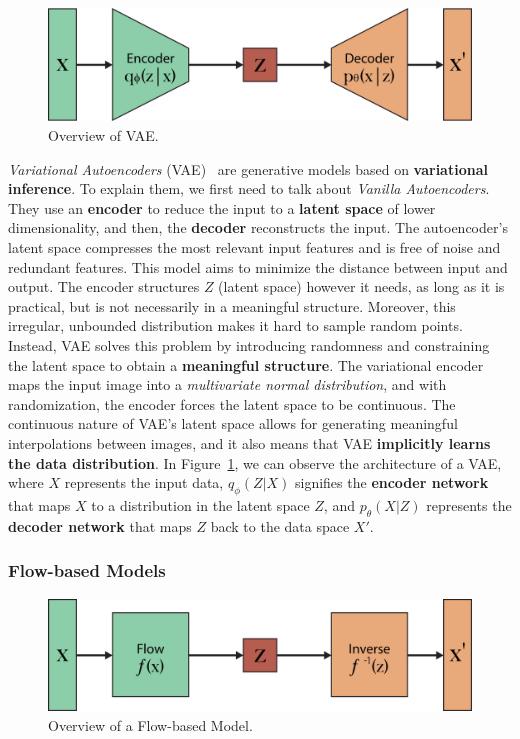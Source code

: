 \documentclass[preprint]{elsarticle}
\begin{document}
\begin{figure}[t]
	\centering
    \includegraphics[scale=0.8]{img/svg/VAE.png}
    \caption{Overview of VAE.}\label{fig:vae}
\end{figure}

\emph{Variational Autoencoders} (VAE)~\cite{kingma2022autoencoding} are generative models based on \textbf{variational inference}.
To explain them, we first need to talk about \emph{Vanilla Autoencoders}.
They use an \textbf{encoder} to reduce the input to a \textbf{latent space} of lower dimensionality, and then, the \textbf{decoder} reconstructs the input. 
The autoencoder's latent space compresses the most relevant input features and is free of noise and redundant features.
This model aims to minimize the distance between input and output. The encoder structures $Z$ (latent space) however it needs, as long as it is practical, but is not necessarily in a meaningful structure. 
Moreover, this irregular, unbounded distribution makes it hard to sample random points.
Instead, VAE solves this problem by introducing randomness and constraining the latent space to obtain a \textbf{meaningful structure}. 
The variational encoder maps the input image into a \emph{multivariate normal distribution}, and with randomization, the encoder forces the latent space to be continuous. 
The continuous nature of VAE's latent space allows for generating meaningful interpolations between images, and it also means that VAE \textbf{implicitly learns the data distribution}. In Figure~\ref{fig:vae}, we can observe the architecture of a VAE, where $X$ represents the input data, $q_\phi(Z|X)$ signifies the \textbf{encoder network} that maps $X$ to a distribution in the latent space $Z$, and $p_\theta(X|Z)$ represents the \textbf{decoder network} that maps $Z$ back to the data space $X'$.

\subsubsection{Flow-based Models}\label{sec:flow}

\begin{figure}[b]
	\centering
    \includegraphics[scale=0.8]{img/svg/FB.png}
    \caption{Overview of a Flow-based Model.}\label{fig:flow}
\end{figure}
\end{document}
